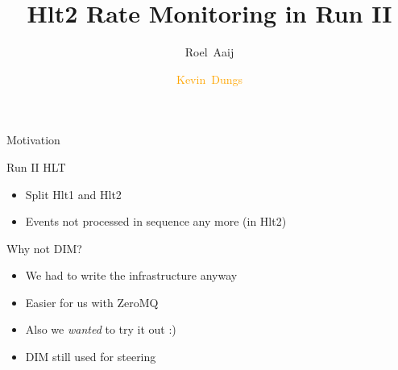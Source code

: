 \documentclass[aspectratio=1610,compress,titleprogressbar]{beamer}
\title{Hlt2 Rate Monitoring in Run II}
\author[K.~Dungs]{Roel~Aaij\inst{1} \and \textcolor{orange}{Kevin~Dungs\inst{2}}}
\institute{\inst{1} CERN \and \inst{2} TU Dortmund}
\begin{document}
\maketitle

\begin{frame}{Motivation}
  \begin{block}{Run II HLT}
    \begin{itemize}
      \item Split Hlt1 and Hlt2
      \item Events not processed in sequence any more (in Hlt2)
    \end{itemize}
  \end{block}
  \begin{block}{Why not DIM?}
    \begin{itemize}
      \item We had to write the infrastructure anyway
      \item Easier for us with ZeroMQ
      \item Also we \emph{wanted} to try it out :)
      \item DIM still used for steering
    \end{itemize}
  \end{block}
\end{frame}
\end{document}
